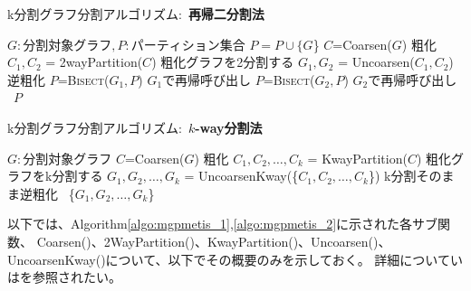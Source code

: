 \begin{algorithm}
\caption{k分割グラフ分割アルゴリズム:\ \textbf{再帰二分割法}\label{algo:mgpmetis_1}}
\begin{small}
\begin{algorithmic}[1]
	\State $G:分割対象グラフ, P: パーティション集合$
		\State $P=P\cup \{G$\} 
	\Else
		\State $C$=Coarsen($G$) \Comment 粗化
		\State $C_1,C_2$ = 2wayPartition($C$) \Comment 粗化グラフを2分割する
		\State $G_1,G_2$ = Uncoarsen($C_1,C_2$) \Comment 逆粗化
		\State $P$=\textsc{Bisect}($G_1,P$) \Comment $G_1$で再帰呼び出し
		\State $P$=\textsc{Bisect}($G_2,P$) \Comment $G_2$で再帰呼び出し
	\EndIf
	\ $P$
\EndFunction
\end{algorithmic}
\end{small}
\end{algorithm}

\begin{algorithm}
\caption{k分割グラフ分割アルゴリズム:\ \textbf{$k$-way分割法}\label{algo:mgpmetis_2}}
\begin{small}
\begin{algorithmic}[1]
	\State $G:分割対象グラフ$
	\State $C$=Coarsen($G$) \Comment 粗化
	\State $C_1,C_2,\dots,C_k$ = KwayPartition($C$) \Comment 粗化グラフをk分割する
	\State $G_1,G_2,\dots,G_k$ = UncoarsenKway(\{$C_1,C_2,\dots,C_k$\}) \Comment k分割そのまま逆粗化
	\ \{$G_1,G_2,\dots,G_k$\}
\EndFunction
\end{algorithmic}
\end{small}
\end{algorithm}

以下では、Algorithm\ref{algo:mgpmetis_1},\ref{algo:mgpmetis_2}に示された各サブ関数、
Coarsen()、2WayPartition()、KwayPartition()、Uncoarsen()、UncoarsenKway()について、以下でその概要のみを示しておく。
詳細についていは\cite{Karypis1999}を参照されたい。

